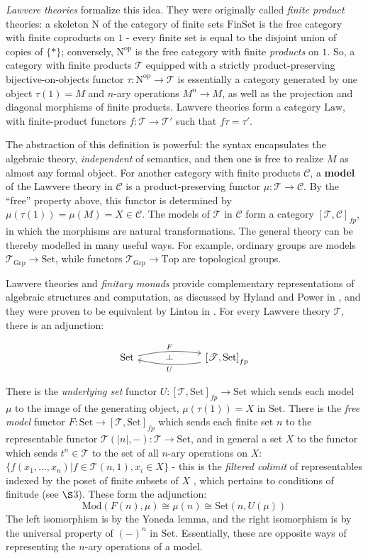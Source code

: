 \documentclass[a4paper,UKenglish]{article}
\theoremstyle{definition}
\def\ld{\rotatebox[origin=c]{-90}{$\dashv$}} %
\newcommand{\Set}{\mathrm{Set}}
\newcommand{\Grp}{\mathrm{Grp}}
\newcommand{\Law}{\mathrm{Law}}
\newcommand{\Top}{\mathrm{Top}}
\newcommand{\Mod}{\mathrm{Mod}}
\newcommand{\FinSet}{\mathrm{FinSet}}
\newcommand{\op}{\mathrm{op}}
\newcommand{\NN}{\mathrm{N}}
\newcommand{\C}{\mathscr{C}}
\newcommand{\T}{\mathscr{T}}
\begin{document}
\textit{Lawvere theories} formalize this idea. They were originally called \textit{finite product} theories: a skeleton $\NN$ of the category of finite sets $\FinSet$ is the free category with finite coproducts on $1$ - every finite set is equal to the disjoint union of copies of $\{*\}$; conversely, $\NN^\op$ is the free category with finite \textit{products} on $1$. So, a category with finite products $\T$ equipped with a strictly product-preserving bijective-on-objects functor $\tau:\NN^\op \to \T$ is essentially a category generated by one object $\tau(1) = M$ and $n$-ary operations $M^n \to M$, as well as the projection and diagonal morphisms of finite products. Lawvere theories form a category $\Law$, with finite-product functors $f: \T\to \T'$ such that $f\tau = \tau'$.

The abstraction of this definition is powerful: the syntax encapsulates the algebraic theory, \textit{independent} of semantics, and then one is free to realize $M$ as almost any formal object. For another category with finite products $\C$, a \textbf{model} of the Lawvere theory in $\C$ is a product-preserving functor $\mu: \T \to \C$. By the ``free'' property above, this functor is determined by $\mu(\tau(1)) = \mu(M) = X \in \C$. The models of $\T$ in $\C$ form a category $[\T,\C]_{fp}$, in which the morphisms are natural transformations. The general theory can be thereby modelled in many useful ways. For example, ordinary groups are models $\T_\Grp \to \Set$, while functors $\T_\Grp \to \Top$ are topological groups.

Lawvere theories and \textit{finitary monads} provide complementary representations of algebraic structures and computation, as discussed by Hyland and Power in \cite{ltam}, and they were proven to be equivalent by Linton in \cite{linton}. For every Lawvere theory $\T$, there is an adjunction:

\[\begin{tikzcd}
	\Set \arrow[bend left=10,below]{rr}{F}
	& \ld &
	\arrow[bend left=10,above]{ll}{U} \left[\T,\Set\right]_{fp}
\end{tikzcd}\]

There is the \textit{underlying set} functor $U:[\T,\Set]_{fp} \to \Set$ which sends each model $\mu$ to the image of the generating object, $\mu(\tau(1)) = X$ in $\Set$. There is the \textit{free model} functor $F:\Set \to [\T,\Set]_{fp}$ which sends each finite set $n$ to the representable functor $\T(|n|,-):\T \to \Set$, and in general a set $X$ to the functor which sends $t^n \in \T$ to the set of all $n$-ary operations on $X$: $\{f(x_1,...,x_n)|f\in \T(n,1), x_i\in X\}$ - this is the \textit{filtered colimit} of representables indexed by the poset of finite subsets of $X$ \cite{nlab}, which pertains to conditions of finitude (see $\S$3). These form the adjunction: $$\Mod(F(n),\mu) \cong \mu(n) \cong \Set(n,U(\mu))$$ The left isomorphism is by the Yoneda lemma, and the right isomorphism is by the universal property of $(-)^n$ in $\Set$. Essentially, these are opposite ways of representing the $n$-ary operations of a model.
\end{document}
